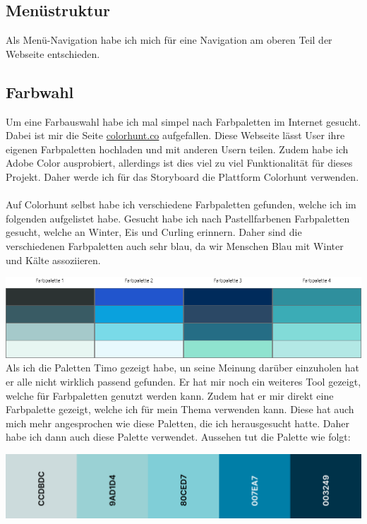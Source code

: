 \documentclass[11pt]{article}
\begin{document}
    \subsection{Menüstruktur}
    Als Menü-Navigation habe ich mich für eine Navigation am oberen Teil der Webseite entschieden.

    \subsection{Farbwahl}
    Um eine Farbauswahl habe ich mal simpel nach Farbpaletten im Internet gesucht. Dabei ist mir die Seite
    \url{colorhunt.co} aufgefallen. Diese Webseite lässt User ihre eigenen Farbpaletten hochladen und mit
    anderen Usern teilen. Zudem habe ich Adobe Color ausprobiert, allerdings ist dies viel zu viel
    Funktionalität für dieses Projekt. Daher werde ich für das Storyboard die Plattform Colorhunt verwenden.\\
    \\
    Auf Colorhunt selbst habe ich verschiedene Farbpaletten gefunden, welche ich im folgenden aufgelistet
    habe. Gesucht habe ich nach Pastellfarbenen %
    Farbpaletten gesucht, welche an Winter, Eis und Curling erinnern.
    Daher sind die verschiedenen Farbpaletten auch sehr blau, da wir Menschen Blau mit Winter und Kälte
    assoziieren.

    \includegraphics[width=\textwidth]{media/color_palettes}
    Als ich die Paletten Timo gezeigt habe, un seine Meinung darüber einzuholen hat er alle nicht wirklich passend
    gefunden. Er hat mir noch ein weiteres Tool gezeigt, welche für Farbpaletten genutzt werden kann. Zudem hat er
    mir direkt eine Farbpalette gezeigt, welche ich für mein Thema verwenden kann. Diese hat auch mich mehr
    angesprochen wie diese Paletten, die ich herausgesucht hatte. Daher habe ich dann auch diese Palette verwendet.
    Aussehen tut die Palette wie folgt:

    \includegraphics[width=\textwidth]{media/color_palette}
\end{document}
